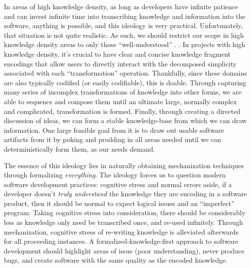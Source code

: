 In areas of high knowledge density, as long as developers have infinite patience
and can invest infinite time into transcribing knowledge and information into
the software, anything is possible, and this ideology is very practical.
Unfortunately, that situation is not quite realistic. As such, we should
restrict our scope in high knowledge density areas to only those
``well-understood'' \cite{well-understood}. . In
projects with high knowledge density, it's crucial to have clear and concise
knowledge fragment encodings that allow users to directly interact with the
decomposed simplicity associated with each ``transformation'' operation.
Thankfully, since these domains are also typically codified (or easily
codifiable), this is doable. Through capturing many series of incomplex
transformations of knowledge into other forms, we are able to sequence and
compose them until an ultimate large, normally complex and complicated,
transformation is formed. Finally, through creating a directed discussion of
ideas, we can form a stable knowledge-base from which we can draw information.
One large feasible goal from it is to draw out usable software artifacts from it
by poking and prodding in all areas needed until we can deterministically form
them, as our needs demand.

The essence of this ideology lies in naturally obtaining mechanization
techniques through formalizing \textit{everything}. The ideology forces us to
question modern software development practices: cognitive stress and normal
errors aside, if a developer doesn't \textit{truly understand} the knowledge
they are encoding in a software product, then it should be normal to expect
logical issues and an ``imperfect'' program. Taking cognitive stress into
consideration, there should be considerably less as knowledge only need be
transcribed once, and re-used infinitely. Through mechanization, cognitive
stress of re-writing knowledge is alleviated afterwards for all proceeding
instances. A formalized-knowledge-first approach to software development should
highlight areas of issue (poor understanding), never produce bugs, and create
software with the same quality as the encoded knowledge.


